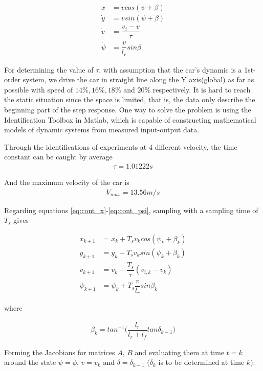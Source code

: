 \begin{align}
  \dot{x} &= v cos(\psi + \beta) \label{eq:cont_x}\\
  \dot{y} &= v sin(\psi + \beta) \label{eq:cont_y}\\
  \dot{v} &= \dfrac{v_i - v}{\tau} \label{eq:cont_v}\\
  \dot{\psi} &= \dfrac{v}{l_r} sin\beta \label{eq:cont_psi}
\end{align}

For determining the value of $\tau$, with assumption that the car's dynamic is a 1st-order system, we drive the car in straight line along the Y axis(global) as far as possible with speed of $14\%,16\%,18\%$ and $20\%$ respectively. It is hard to reach the static situation since the space is limited, that is, the data only describe the beginning part of the step response. One way to solve the problem is using the Identification Toolbox in Matlab, which is capable of constructing mathematical models of dynamic systems from measured input-output data.

Through the identifications of experiments at 4 different velocity, the time constant can be caught by average
\begin{align}
    \tau = 1.01222s
\end{align}

And the maximum velocity of the car is
\begin{align}
    V_{max} = 13.56m/s
\end{align}



Regarding equations \ref{eq:cont_x}-\ref{eq:cont_psi}, sampling with a sampling
time of $T_s$ gives

\begin{align}
  x_{k+1} &= x_{k} + T_s v_k cos(\psi_k + \beta_k) \\
  y_{k+1} &= y_{k} + T_s v_k sin(\psi_k + \beta_k) \\
  v_{k+1} &= v_{k} + \dfrac{T_s}{\tau} (v_{i,k} - v_{k}) \\
  \psi_{k+1} &= \psi_{k} + T_s \dfrac{v}{l_r} sin\beta_k
\end{align}

where

\begin{align}
  \beta_k = tan^{-1}\Big(\dfrac{l_r}{l_r + l_f} tan\delta_{k-1}\Big)
\end{align}


Forming the Jacobians for matrices $A$, $B$ and evaluating them at time
$t=k$ around the state $\psi = \phi$, $v = v_k$ and
$\delta = \delta_{k-1}$ ($\delta_k$ is to be determined at time $k$):

